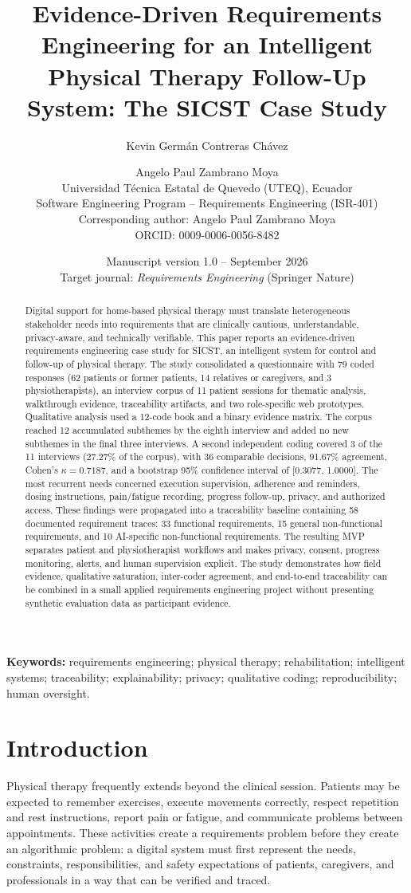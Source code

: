 \documentclass[10pt,a4paper]{article}
\title{\textbf{Evidence-Driven Requirements Engineering for an Intelligent Physical Therapy Follow-Up System: The SICST Case Study}}
\author{Kevin Germán Contreras Chávez \and Angelo Paul Zambrano Moya\\
\small Universidad Técnica Estatal de Quevedo (UTEQ), Ecuador\\
\small Software Engineering Program -- Requirements Engineering (ISR-401)\\
\small Corresponding author: Angelo Paul Zambrano Moya\\
\small ORCID: 0009-0006-0056-8482}
\date{Manuscript version 1.0 -- September 2026\\
\small Target journal: \textit{Requirements Engineering} (Springer Nature)}
\begin{document}
\maketitle

\begin{abstract}
Digital support for home-based physical therapy must translate heterogeneous stakeholder needs into requirements that are clinically cautious, understandable, privacy-aware, and technically verifiable. This paper reports an evidence-driven requirements engineering case study for SICST, an intelligent system for control and follow-up of physical therapy. The study consolidated a questionnaire with 79 coded responses (62 patients or former patients, 14 relatives or caregivers, and 3 physiotherapists), an interview corpus of 11 patient sessions for thematic analysis, walkthrough evidence, traceability artifacts, and two role-specific web prototypes. Qualitative analysis used a 12-code book and a binary evidence matrix. The corpus reached 12 accumulated subthemes by the eighth interview and added no new subthemes in the final three interviews. A second independent coding covered 3 of the 11 interviews (27.27\% of the corpus), with 36 comparable decisions, 91.67\% agreement, Cohen's $\kappa=0.7187$, and a bootstrap 95\% confidence interval of [0.3077, 1.0000]. The most recurrent needs concerned execution supervision, adherence and reminders, dosing instructions, pain/fatigue recording, progress follow-up, privacy, and authorized access. These findings were propagated into a traceability baseline containing 58 documented requirement traces: 33 functional requirements, 15 general non-functional requirements, and 10 AI-specific non-functional requirements. The resulting MVP separates patient and physiotherapist workflows and makes privacy, consent, progress monitoring, alerts, and human supervision explicit. The study demonstrates how field evidence, qualitative saturation, inter-coder agreement, and end-to-end traceability can be combined in a small applied requirements engineering project without presenting synthetic evaluation data as participant evidence.
\end{abstract}

\noindent\textbf{Keywords:} requirements engineering; physical therapy; rehabilitation; intelligent systems; traceability; explainability; privacy; qualitative coding; reproducibility; human oversight.

\section{Introduction}
Physical therapy frequently extends beyond the clinical session. Patients may be expected to remember exercises, execute movements correctly, respect repetition and rest instructions, report pain or fatigue, and communicate problems between appointments. These activities create a requirements problem before they create an algorithmic problem: a digital system must first represent the needs, constraints, responsibilities, and safety expectations of patients, caregivers, and professionals in a way that can be verified and traced.
\end{document}
